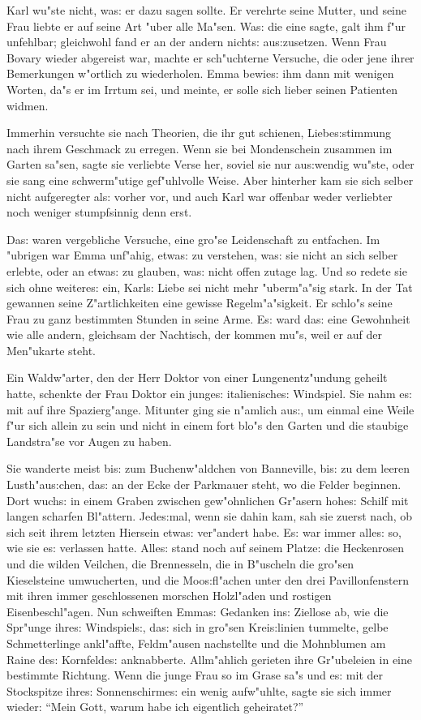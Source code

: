 \documentclass[oneside,12pt]{book}
\newcommand{\s}{s:}%
\begin{document}
Karl wu"ste nicht, wa{\s} er dazu sagen sollte. Er verehrte seine
Mutter, und seine Frau liebte er auf seine Art "uber alle Ma"sen.
Wa{\s} die eine sagte, galt ihm f"ur unfehlbar; gleichwohl fand er
an der andern nicht{\s} au{\s}zusetzen. Wenn Frau Bovary wieder
abgereist war, machte er sch"uchterne Versuche, die oder jene
ihrer Bemerkungen w"ortlich zu wiederholen. Emma bewie{\s} ihm
dann mit wenigen Worten, da"s er im Irrtum sei, und meinte, er
solle sich lieber seinen Patienten widmen.

Immerhin versuchte sie nach Theorien, die ihr gut schienen,
Liebe{\s}stimmung nach ihrem Geschmack zu erregen. Wenn sie bei
Mondenschein zusammen im Garten sa"sen, sagte sie verliebte Verse
her, soviel sie nur au{\s}wendig wu"ste, oder sie sang eine
schwerm"utige gef"uhlvolle Weise. Aber hinterher kam sie sich
selber nicht aufgeregter al{\s} vorher vor, und auch Karl war
offenbar weder verliebter noch weniger stumpfsinnig denn erst.

Da{\s} waren vergebliche Versuche, eine gro"se Leidenschaft zu
entfachen. Im "ubrigen war Emma unf"ahig, etwa{\s} zu verstehen,
wa{\s} sie nicht an sich selber erlebte, oder an etwa{\s} zu
glauben, wa{\s} nicht offen zutage lag. Und so redete sie sich
ohne weitere{\s} ein, Karl{\s} Liebe sei nicht mehr "uberm"a"sig
stark. In der Tat gewannen seine Z"artlichkeiten eine gewisse
Regelm"a"sigkeit. Er schlo"s seine Frau zu ganz bestimmten Stunden
in seine Arme. E{\s} ward da{\s} eine Gewohnheit wie alle andern,
gleichsam der Nachtisch, der kommen mu"s, weil er auf der
Men"ukarte steht.

Ein Waldw"arter, den der Herr Doktor von einer Lungenent\/z"undung
geheilt hatte, schenkte der Frau Doktor ein junge{\s}
italienische{\s} Windspiel. Sie nahm e{\s} mit auf ihre
Spazierg"ange. Mitunter ging sie n"amlich au{\s}, um einmal eine
Weile f"ur sich allein zu sein und nicht in einem fort blo"s den
Garten und die staubige Landstra"se vor Augen zu haben.

Sie wanderte meist bi{\s} zum Buchenw"aldchen von Banneville,
bi{\s} zu dem leeren Lusth"au{\s}chen, da{\s} an der Ecke der
Parkmauer steht, wo die Felder beginnen. Dort wuch{\s} in einem
Graben zwischen gew"ohnlichen Gr"asern hohe{\s} Schilf mit langen
scharfen Bl"attern. Jede{\s}mal, wenn sie dahin kam, sah sie
zuerst nach, ob sich seit ihrem letzten Hiersein etwa{\s}
ver"andert habe. E{\s} war immer alle{\s} so, wie sie e{\s}
verlassen hatte. Alle{\s} stand noch auf seinem Platze: die
Heckenrosen und die wilden Veilchen, die Brennesseln, die in
B"uscheln die gro"sen Kieselsteine umwucherten, und die
Moo{\s}fl"achen unter den drei Pavillonfenstern mit ihren immer
geschlossenen morschen Holzl"aden und rostigen Eisenbeschl"agen.
Nun schweiften Emma{\s} Gedanken in{\s} Ziellose ab, wie die
Spr"unge ihre{\s} Windspiel{\s}, da{\s} sich in gro"sen
Krei{\s}linien tummelte, gelbe Schmetterlinge ankl"affte,
Feldm"ausen nachstellte und die Mohnblumen am Raine de{\s}
Kornfelde{\s} anknabberte. Allm"ahlich gerieten ihre Gr"ubeleien
in eine bestimmte Richtung. Wenn die junge Frau so im Grase sa"s
und e{\s} mit der Stockspitze ihre{\s} Sonnenschirme{\s} ein wenig
aufw"uhlte, sagte sie sich immer wieder: "`Mein Gott, warum habe
ich eigentlich geheiratet?"'
\end{document}
